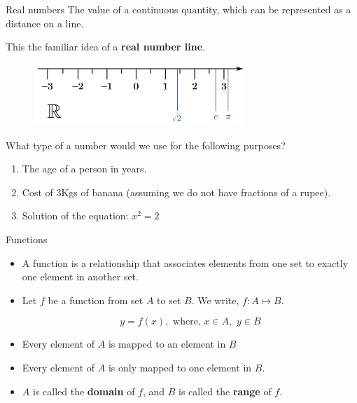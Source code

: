 \documentclass[aspectratio=169]{beamer}
\begin{document}
\begin{frame}[t]{Real numbers}
    The value of a continuous quantity, which can be represented as a distance on a line. 
    
    This the familiar idea of a \textbf{real number line}.
    
    \begin{figure}[h]
        \centering
        \includegraphics[width=8cm]{figs/realline.png}
    \end{figure}

    What type of a number would we use for the following purposes?
    \begin{enumerate}
        \item The age of a person in years.
        \item Cost of 3Kgs of banana (assuming we do not have fractions of a rupee).
        \item Solution of the equation: $x^2 = 2$
    \end{enumerate}
\end{frame}

\begin{frame}[t]{Functions}
    \begin{itemize} 
        \item A function is a relationship that associates elements from one set to exactly one element in another set.
    
        \item Let $f$ be a function from set $A$ to set $B$. We write, $f: A \mapsto B$.
    
        $$ y = f(x), \,\, \text{where, } x \in A, \,\, y \in B$$
    
        \item Every element of $A$ is mapped to an element in $B$
        
        \item Every element of $A$ is only mapped to one element in $B$.
    
        \item $A$ is called the \textbf{domain} of $f$, and $B$ is called the \textbf{range} of $f$. 
    \end{itemize}
\end{frame}
\end{document}
